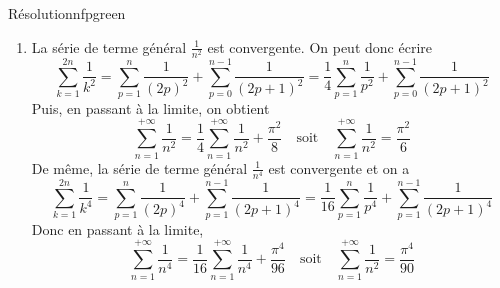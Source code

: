 \begin{omed}{Résolution}{nfpgreen}
\begin{enumerate}
\begin{align*}
                &=\frac{\pi^2}{4} + \frac{8}{\pi^2} \sum\limits_{p=0}^{+\infty} \frac{1}{(2p+1)^4}
            \end{align*} 
            Ce qui nous donne directement 
            \[ \sum\limits_{p=0}^{+\infty} \frac{1}{(2p+1)^4} = \frac{\pi^4}{96} \] 
            \item La série de terme général $\frac{1}{n^2}$ est convergente. On peut donc écrire 
            \[ \sum\limits_{k=1}^{2n} \frac{1}{k^2} = \sum\limits_{p=1}^{n} \frac{1}{(2p)^2} + \sum\limits_{p=0}^{n-1} \frac{1}{(2p+1)^2} = \frac{1}{4}\sum\limits_{p=1}^n \frac{1}{p^2} +  \sum\limits_{p=0}^{n-1} \frac{1}{(2p+1)^2} \] 
            Puis, en passant à la limite, on obtient 
            \[ \sum\limits_{n=1}^{+\infty} \frac{1}{n^2} = \frac{1}{4}\sum\limits_{n=1}^{+\infty} \frac{1}{n^2} + \frac{\pi^2}{8} \quad \text{soit} \quad \sum\limits_{n=1}^{+\infty} \frac{1}{n^2} = \frac{\pi^2}{6} \] 
            De même, la série de terme général $\frac{1}{n^4}$ est convergente et on a 
            \[ \sum\limits_{k=1}^{2n} \frac{1}{k^4} = \sum\limits_{p=1}^{n} \frac{1}{(2p)^4} + \sum\limits_{p=1}^{n-1} \frac{1}{(2p+1)^4} = \frac{1}{16} \sum\limits_{p=1}^{n} \frac{1}{p^4} +  \sum\limits_{p=1}^{n-1} \frac{1}{(2p+1)^4} \] 
            Donc en passant à la limite, 
            \[ \sum\limits_{n=1}^{+\infty} \frac{1}{n^4} = \frac{1}{16}\sum\limits_{n=1}^{+\infty} \frac{1}{n^4} + \frac{\pi^4}{96} \quad \text{soit} \quad \sum\limits_{n=1}^{+\infty} \frac{1}{n^2} = \frac{\pi^4}{90} \] 
        \end{enumerate}
    \end{omed}

    



